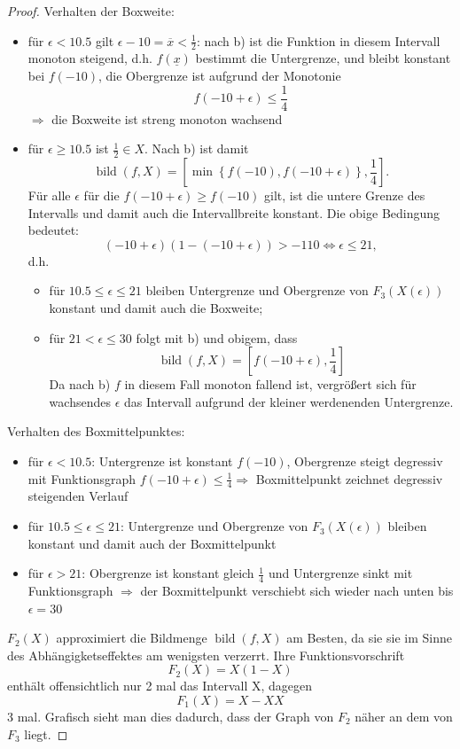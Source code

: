 \documentclass[12pt]{extreport} %
\begin{document}
\begin{enumerate}
		\begin{proof}
			Verhalten der Boxweite: 
			\begin{itemize}
				\item für $\epsilon < 10.5$ gilt $\epsilon - 10 = \overline{x} < \frac{1}{2}$: nach b) ist die Funktion in diesem Intervall monoton steigend, d.h. $f(\underline{x})$ bestimmt die Untergrenze, und bleibt konstant bei $f(-10)$, die Obergrenze ist  aufgrund der Monotonie 
					$$ f(-10+\epsilon) \leq \frac{1}{4} $$
					$\Rightarrow$ die Boxweite ist streng monoton wachsend
				\item für $\epsilon \geq 10.5$ ist $\frac{1}{2} \in X$. Nach b) ist damit 
					 $$ \operatorname{bild}(f,X)  = \left[ \min \left\{ f(-10), f(-10 + \epsilon) \right\},  \frac{1}{4} \right]. $$
					 Für alle $\epsilon$ für die $f(-10 + \epsilon) \geq f(-10)$ gilt, ist die untere Grenze des Intervalls und damit auch die Intervallbreite konstant. Die obige Bedingung bedeutet:
					 $$ (-10 + \epsilon)(1 - (-10 + \epsilon)) > -110 \iff \epsilon \leq 21,  $$
					 d.h.
					 \begin{itemize}
					 	\item für $10.5 \leq \epsilon \leq 21$ bleiben Untergrenze und Obergrenze von $F_3(X(\epsilon))$ konstant und damit auch die Boxweite;
						\item für $21 < \epsilon \leq 30$ folgt mit b) und obigem, dass 
							$$ \operatorname{bild}(f,X)  = \left[ f(-10 + \epsilon),  \frac{1}{4} \right] $$
						Da nach b) $f$ in diesem Fall monoton fallend ist, vergrößert sich für wachsendes $\epsilon$ das Intervall aufgrund der kleiner werdenenden Untergrenze.
					 \end{itemize}
				 
			\end{itemize}
			Verhalten des Boxmittelpunktes:
			\begin{itemize}
				\item für $\epsilon < 10.5$: Untergrenze ist konstant  $f(-10)$, Obergrenze steigt degressiv mit Funktionsgraph $f(-10+\epsilon) \leq \frac{1}{4} \Rightarrow$ Boxmittelpunkt zeichnet degressiv steigenden Verlauf
				\item für $10.5 \leq \epsilon \leq 21$: Untergrenze und Obergrenze von $F_3(X(\epsilon))$ bleiben konstant und damit auch der Boxmittelpunkt
				\item für $\epsilon>21$: Obergrenze ist konstant gleich $\frac{1}{4}$ und Untergrenze sinkt mit Funktionsgraph $\Rightarrow$ der Boxmittelpunkt verschiebt sich wieder nach unten bis $\epsilon=30$
			\end{itemize}
			$F_2(X)$ approximiert die Bildmenge $\operatorname{bild}(f,X)$ am Besten, da sie sie im Sinne des Abhängigketseffektes am wenigsten verzerrt. Ihre Funktionsvorschrift $$F_2(X)=X(1-X)$$ enthält offensichtlich nur 2 mal das Intervall X, dagegen $$F_1(X)=X-XX$$ 3 mal. Grafisch sieht man dies dadurch, dass der Graph von $F_2$ näher an dem von $F_3$ liegt.
		\end{proof}
\end{enumerate}
\end{document}

